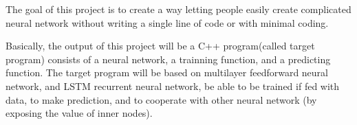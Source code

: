 The goal of this project is to create a way letting people easily create
complicated neural network without writing a single line of code or with minimal
coding. 
\par
Basically, the output of this project will be a C++ program(called target
program) consists of a neural network, a trainning function, and a predicting
function. The target program will be based on multilayer feedforward neural
network, and LSTM recurrent neural network, be able to be trained if fed with
data, to make prediction, and to cooperate with other neural network (by
exposing the value of inner nodes).
